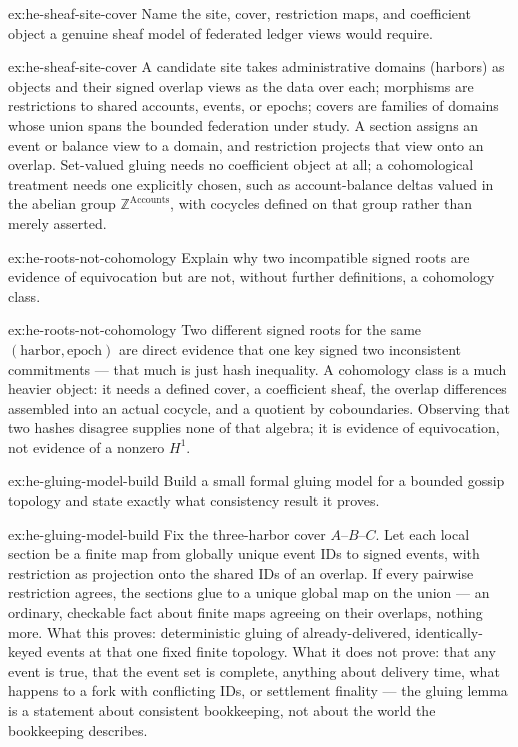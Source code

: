 \documentclass[11pt,a4paper]{article}
\theoremstyle{definition}
\theoremstyle{definition}
\theoremstyle{remark}
\begin{document}
\begin{pdexercise}[kind=Check,rating=1]{ex:he-sheaf-site-cover}
Name the site, cover, restriction maps, and coefficient object a genuine
  sheaf model of federated ledger views would require.
\end{pdexercise}
\begin{pdsolution}{ex:he-sheaf-site-cover}
A candidate site takes administrative domains (harbors) as objects and
their signed overlap views as the data over each; morphisms are restrictions to
shared accounts, events, or epochs; covers are families of domains whose union
spans the bounded federation under study. A section assigns an event or balance
view to a domain, and restriction projects that view onto an overlap. Set-valued
gluing needs no coefficient object at all; a cohomological treatment needs one
explicitly chosen, such as account-balance deltas valued in the abelian group
$\mathbb{Z}^{\text{Accounts}}$, with cocycles defined on that group rather than
merely asserted.
\end{pdsolution}
\begin{pdexercise}[kind=Check,rating=1]{ex:he-roots-not-cohomology}
Explain why two incompatible signed roots are evidence of equivocation but
  are not, without further definitions, a cohomology class.
\end{pdexercise}
\begin{pdsolution}{ex:he-roots-not-cohomology}
Two different signed roots for the same $(\text{harbor},\text{epoch})$ are
direct evidence that one key signed two inconsistent commitments --- that much
is just hash inequality. A cohomology class is a much heavier object: it needs a
defined cover, a coefficient sheaf, the overlap differences assembled into an
actual cocycle, and a quotient by coboundaries. Observing that two hashes
disagree supplies none of that algebra; it is evidence of equivocation, not
evidence of a nonzero $H^1$.
\end{pdsolution}
\begin{pdexercise}[kind=Open,rating=3]{ex:he-gluing-model-build}
Build a small formal gluing model for a bounded gossip topology and
  state exactly what consistency result it proves.
\end{pdexercise}
\begin{pdsolution}{ex:he-gluing-model-build}
Fix the three-harbor cover $A$--$B$--$C$. Let each local section be a
finite map from globally unique event IDs to signed events, with restriction as
projection onto the shared IDs of an overlap. If every pairwise restriction
agrees, the sections glue to a unique global map on the union --- an ordinary,
checkable fact about finite maps agreeing on their overlaps, nothing more. What
this proves: deterministic gluing of already-delivered, identically-keyed events
at that one fixed finite topology. What it does not prove: that any event is
true, that the event set is complete, anything about delivery time, what happens
to a fork with conflicting IDs, or settlement finality --- the gluing lemma is a
statement about consistent bookkeeping, not about the world the bookkeeping
describes.
\end{pdsolution}
\end{document}

